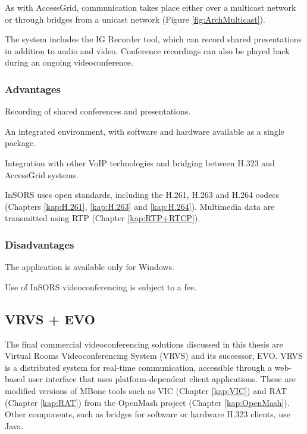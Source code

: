 As with AccessGrid, communication takes place either over a multicast network or through bridges from a unicast network (Figure \ref{fig:ArchMulticast}).

The system includes the IG Recorder tool, which can record shared presentations in addition to audio and video. Conference recordings can also be played back during an ongoing videoconference.

\subsubsection*{Advantages}
\begin{paklist}
\item Recording of shared conferences and presentations.
\item An integrated environment, with software and hardware available as a single package.
\item Integration with other VoIP technologies and bridging between H.323 and AccessGrid systems.
\item InSORS uses open standards, including the H.261, H.263 and H.264 codecs (Chapters \ref{kap:H.261}, \ref{kap:H.263} and \ref{kap:H.264}). Multimedia data are transmitted using RTP (Chapter \ref{kap:RTP+RTCP}).
\end{paklist}

\subsubsection*{Disadvantages}
\begin{paklist}
\item The application is available only for Windows.
\item Use of InSORS videoconferencing is subject to a fee.
\end{paklist}

\subsection{VRVS + EVO}\label{kap:VRVS}
The final commercial videoconferencing solutions discussed in this thesis are Virtual Rooms Videoconferencing System (VRVS) and its successor, EVO. VRVS is a distributed system for real-time communication, accessible through a web-based user interface that uses platform-dependent client applications. These are modified versions of MBone tools such as VIC (Chapter \ref{kap:VIC}) and RAT (Chapter \ref{kap:RAT}) from the OpenMash project (Chapter \ref{kap:OpenMash}). Other components, such as bridges for software or hardware H.323 clients, use Java.


